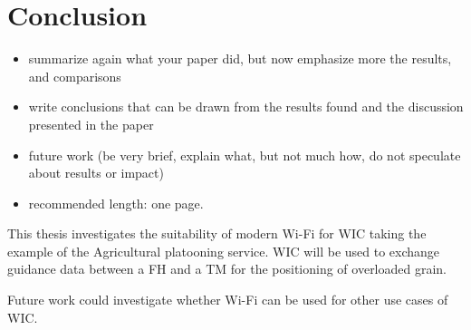 \chapter{Conclusion}
\acresetall

\begin{itemize}
\item summarize again what your paper did, but now emphasize more the results, and comparisons
\item write conclusions that can be drawn from the results found and the discussion presented in the paper
\item future work (be very brief, explain what, but not much how, do not speculate about results or impact)
\item recommended length: one page.
\end{itemize}

This thesis investigates the suitability of modern Wi-Fi for \ac{WIC} taking the example of the Agricultural platooning service.
\ac{WIC} will be used to exchange guidance data between a \ac{FH} and a \ac{TM} for the positioning of overloaded grain.

\begin{comment}
    Untersuchen, welche Routing protocols
\end{comment}

Future work could investigate whether Wi-Fi can be used for other use cases of \ac{WIC}.
